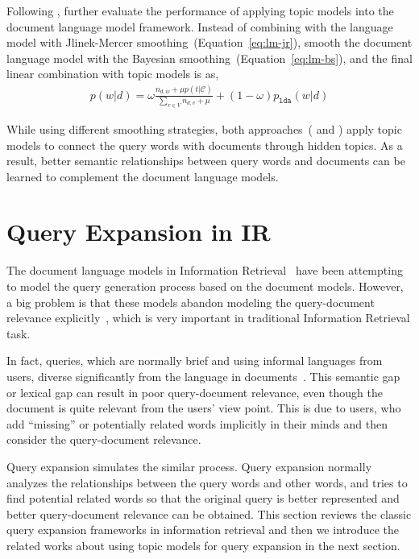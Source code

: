 
Following \cite{wei-06}, \cite{Lu-2011} further evaluate the
performance of applying topic models into the document language model
framework. Instead of combining with the language model with
Jlinek-Mercer smoothing~(Equation~\ref{eq:lm-jr}), \cite{Lu-2011}
smooth the document language model with the Bayesian
smoothing~(Equation~\ref{eq:lm-bs}), and the final linear combination
with topic models is as,
\begin{align}
p(w|d) = \omega \frac{n_{d,w} + \mu p(t|\mathcal{C})}{\sum_{v \in V} n_{d,v} + \mu}  + (1 - \omega) p_{\texttt{lda}}(w|d)
\end{align}

While using different smoothing strategies, both
approaches~(\citep{wei-06} and \citep{Lu-2011}) apply topic models to
connect the query words with documents through hidden topics. As a
result, better semantic relationships between query words and
documents can be learned to complement the document language models.

\section{Query Expansion in IR}

The document language models in Information
Retrieval~\citep{PonteCroft} have been attempting to model the query
generation process based on the document models. However, a big
problem is that these models abandon modeling the query-document
relevance explicitly~\citep{Lavrenko-2001}, which is very important in
traditional Information Retrieval task.

In fact, queries, which are normally brief and using informal
languages from users, diverse significantly from the language in
documents~\citep{Muller-2009}. This semantic gap or lexical gap can
result in poor query-document relevance, even though the document is
quite relevant from the users' view point. This is due to users, who
add ``missing'' or potentially related words implicitly in their minds
and then consider the query-document relevance.

Query expansion simulates the similar process. Query expansion
normally analyzes the relationships between the query words and other
words, and tries to find potential related words so that the original
query is better represented and better query-document relevance can be
obtained. This section reviews the classic query expansion frameworks
in information retrieval and then we introduce the related works about
using topic models for query expansion in the next section.

